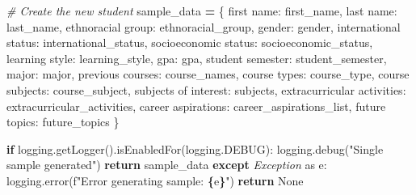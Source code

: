 \documentclass[
  twocolumn]{article}
\newenvironment{Shaded}{\begin{snugshade}}{\end{snugshade}}
\newcommand{\CommentTok}[1]{\textcolor[rgb]{0.56,0.35,0.01}{\textit{#1}}}
\newcommand{\ControlFlowTok}[1]{\textcolor[rgb]{0.13,0.29,0.53}{\textbf{#1}}}
\newcommand{\ImportTok}[1]{#1}
\newcommand{\NormalTok}[1]{#1}
\newcommand{\OperatorTok}[1]{\textcolor[rgb]{0.81,0.36,0.00}{\textbf{#1}}}
\newcommand{\PreprocessorTok}[1]{\textcolor[rgb]{0.56,0.35,0.01}{\textit{#1}}}
\newcommand{\SpecialCharTok}[1]{\textcolor[rgb]{0.81,0.36,0.00}{\textbf{#1}}}
\newcommand{\SpecialStringTok}[1]{\textcolor[rgb]{0.31,0.60,0.02}{#1}}
\newcommand{\StringTok}[1]{\textcolor[rgb]{0.31,0.60,0.02}{#1}}
\newcommand{\VariableTok}[1]{\textcolor[rgb]{0.00,0.00,0.00}{#1}}
\begin{document}
\begin{Shaded}
\begin{Highlighting}[]
            \CommentTok{\# Create the new \textquotesingle{}student\textquotesingle{}}
\NormalTok{            sample\_data }\OperatorTok{=}\NormalTok{ \{}
                \StringTok{\textquotesingle{}first name\textquotesingle{}}\NormalTok{: first\_name,}
                \StringTok{\textquotesingle{}last name\textquotesingle{}}\NormalTok{: last\_name,}
                \StringTok{\textquotesingle{}ethnoracial group\textquotesingle{}}\NormalTok{: ethnoracial\_group,}
                \StringTok{\textquotesingle{}gender\textquotesingle{}}\NormalTok{: gender,}
                \StringTok{\textquotesingle{}international status\textquotesingle{}}\NormalTok{: international\_status,}
                \StringTok{\textquotesingle{}socioeconomic status\textquotesingle{}}\NormalTok{: socioeconomic\_status,}
                \StringTok{\textquotesingle{}learning style\textquotesingle{}}\NormalTok{: learning\_style,}
                \StringTok{\textquotesingle{}gpa\textquotesingle{}}\NormalTok{: gpa,}
                \StringTok{\textquotesingle{}student semester\textquotesingle{}}\NormalTok{: student\_semester,}
                \StringTok{\textquotesingle{}major\textquotesingle{}}\NormalTok{: major,}
                \StringTok{\textquotesingle{}previous courses\textquotesingle{}}\NormalTok{: course\_names,}
                \StringTok{\textquotesingle{}course types\textquotesingle{}}\NormalTok{: course\_type,}
                \StringTok{\textquotesingle{}course subjects\textquotesingle{}}\NormalTok{: course\_subject,}
                \StringTok{\textquotesingle{}subjects of interest\textquotesingle{}}\NormalTok{: subjects,}
                \StringTok{\textquotesingle{}extracurricular activities\textquotesingle{}}\NormalTok{: extracurricular\_activities,}
                \StringTok{\textquotesingle{}career aspirations\textquotesingle{}}\NormalTok{: career\_aspirations\_list,}
                \StringTok{\textquotesingle{}future topics\textquotesingle{}}\NormalTok{: future\_topics}
\NormalTok{            \}}

            \ControlFlowTok{if}\NormalTok{ logging.getLogger().isEnabledFor(logging.DEBUG):}
\NormalTok{                logging.debug(}\StringTok{"Single sample generated"}\NormalTok{)}
            \ControlFlowTok{return}\NormalTok{ sample\_data}
        \ControlFlowTok{except} \PreprocessorTok{Exception} \ImportTok{as}\NormalTok{ e:}
\NormalTok{            logging.error(}\SpecialStringTok{f"Error generating sample: }\SpecialCharTok{\{}\NormalTok{e}\SpecialCharTok{\}}\SpecialStringTok{"}\NormalTok{)}
            \ControlFlowTok{return} \VariableTok{None}
\end{Highlighting}
\end{Shaded}
\end{document}
